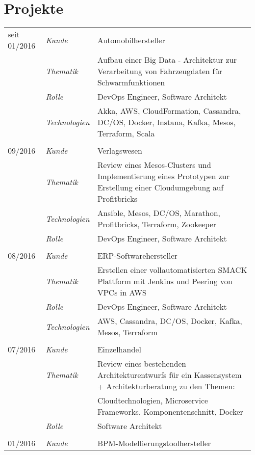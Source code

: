 \section*{Projekte}
\renewcommand{\arraystretch}{1.3}
\begin{longtable}{@{}>{}p{4cm}>{\itshape}p{2cm}>{}p{9cm}}
seit 01/2016        & Kunde 	    & Automobilhersteller\\
\nopagebreak		& Thematik	    & Aufbau einer Big Data - Architektur zur Verarbeitung von Fahrzeugdaten für Schwarmfunktionen\\
\nopagebreak		& Rolle 	    & DevOps Engineer, Software Architekt\\
\nopagebreak		& Technologien	& Akka, AWS, CloudFormation, Cassandra, DC/OS, Docker, Instana, Kafka, Mesos, Terraform, Scala\\
\\
09/2016             & Kunde 	    & Verlagswesen\\
\nopagebreak		& Thematik	    & Review eines Mesos-Clusters und Implementierung eines Prototypen zur Erstellung einer Cloudumgebung auf Profitbricks\\
\nopagebreak		& Technologien	& Ansible, Mesos, DC/OS, Marathon, Profitbricks, Terraform, Zookeeper\\
\nopagebreak		& Rolle 	    & DevOps Engineer, Software Architekt\\
\\
08/2016             & Kunde 	    & ERP-Softwarehersteller\\
\nopagebreak		& Thematik	    & Erstellen einer vollautomatisierten SMACK Plattform mit Jenkins und Peering von VPCs in AWS\\
\nopagebreak		& Rolle 	    & DevOps Engineer, Software Architekt\\
\nopagebreak		& Technologien	& AWS, Cassandra, DC/OS, Docker, Kafka, Mesos, Terraform\\
\\
07/2016             & Kunde 	    & Einzelhandel\\
\nopagebreak		& Thematik	    & Review eines bestehenden Architekturentwurfs für ein Kassensystem + Architekturberatung zu den Themen:\\
\nopagebreak		&           	& Cloudtechnologien, Microservice Frameworks, Komponentenschnitt, Docker\\
\nopagebreak		& Rolle 	    & Software Architekt\\
\\
01/2016             & Kunde 	    & BPM-Modellierungstoolhersteller\\

\end{longtable}
